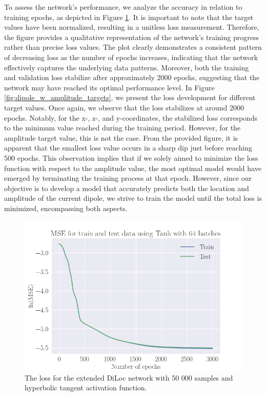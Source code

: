 \documentclass[a4paper, UKenglish, 11pt]{uiomaster}
\begin{document}
To assess the network's performance, we analyze the accuracy in relation to training epochs, as depicted in Figure \ref{fig:dipole_w_amplitude_loss}. It is important to note that the target values have been normalized, resulting in a unitless loss measurement. Therefore, the figure provides a qualitative representation of the network's training progress rather than precise loss values. The plot clearly demonstrates a consistent pattern of decreasing loss as the number of epochs increases, indicating that the network effectively captures the underlying data patterns. Moreover, both the training and validation loss stabilize after approximately 2000 epochs, suggesting that the network may have reached its optimal performance level. In Figure \ref{fig:dipole_w_amplitude_targets}, we present the loss development for different target values. Once again, we observe that the loss stabilizes at around 2000 epochs. Notably, for the x-, z-, and y-coordinates, the stabilized loss corresponds to the minimum value reached during the training period. However, for the amplitude target value, this is not the case. From the provided figure, it is apparent that the smallest loss value occurs in a sharp dip just before reaching 500 epochs. This observation implies that if we solely aimed to minimize the loss function with respect to the amplitude value, the most optimal model would have emerged by terminating the training process at that epoch. However, since our objective is to develop a model that accurately predicts both the location and amplitude of the current dipole, we strive to train the model until the total loss is minimized, encompassing both aspects.

\begin{figure}[!htb]
    \centering
    \includegraphics[width=\linewidth]{figures/MSE_tanh_50000_3july_mseloss_MSE_dipole_w_amplitude_3000_SGD_lr0.001_wd0.1_mom0.35_bs64_Tanh_64_3000_N_dipoles_1.png}
    \caption{The loss for the extended DiLoc network with 50 000 samples and hyperbolic tangent activation function.}
    \label{fig:dipole_w_amplitude_loss}
\end{figure}
\end{document}
